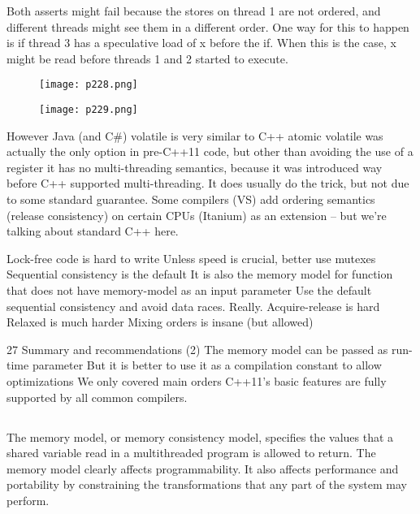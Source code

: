 Both asserts might fail because the stores on thread 1 are not ordered,
 and different threads might see them in a different order. 
 One way for this to happen is if thread 3 has a speculative load of x before 
 the if. When this is the case, x might be read before threads 1 and 2 
 started to execute.


 \begin{figure}[H]
    \centering
    \texttt{[image: p228.png]}
    \caption{}
    \label{fig:p228}
\end{figure}

\begin{figure}[H]
    \centering
    \texttt{[image: p229.png]}
    \caption{}
    \label{fig:p229}
\end{figure}


However Java (and C\#) volatile is very similar to C++ atomic
volatile was actually the only option in pre-C++11 code, but other than avoiding the use of a register it has no multi-threading semantics, because it was introduced way before C++ supported multi-threading. It does usually do the trick, but not due to some standard guarantee.
Some compilers (VS) add ordering semantics (release consistency) on certain CPUs (Itanium) as an extension – but we’re talking about standard C++ here.


Lock-free code is hard to write
Unless speed is crucial, better use mutexes
Sequential consistency is the default
It is also the memory model for function that does not have memory-model as an input parameter
Use the default sequential consistency and avoid data races. Really.
Acquire-release is hard
Relaxed is much harder
Mixing orders is insane (but allowed)

27 Summary and recommendations (2)
The memory model can be passed as run-time parameter
But it is better to use it as a compilation constant to allow optimizations
We only covered main orders
C++11’s basic features are fully supported by all common compilers.



\subsection{}


The memory model, or memory consistency model, specifies the
values that a shared variable read in a multithreaded program is allowed to return. 
The memory model clearly affects programmability. 
It also affects performance and portability by constraining the
transformations that any part of the system may perform. 






